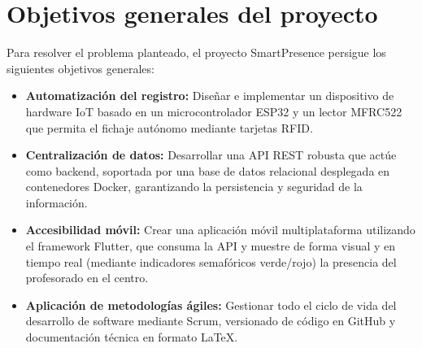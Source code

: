 \documentclass[12pt, a4paper]{report}
\begin{document}
\section{Objetivos generales del proyecto}
Para resolver el problema planteado, el proyecto SmartPresence persigue los siguientes objetivos generales:
\begin{itemize}
    \item \textbf{Automatización del registro:} Diseñar e implementar un dispositivo de hardware IoT basado en un microcontrolador ESP32 y un lector MFRC522 que permita el fichaje autónomo mediante tarjetas RFID.
    \item \textbf{Centralización de datos:} Desarrollar una API REST robusta que actúe como backend, soportada por una base de datos relacional desplegada en contenedores Docker, garantizando la persistencia y seguridad de la información.
    \item \textbf{Accesibilidad móvil:} Crear una aplicación móvil multiplataforma utilizando el framework Flutter, que consuma la API y muestre de forma visual y en tiempo real (mediante indicadores semafóricos verde/rojo) la presencia del profesorado en el centro.
    \item \textbf{Aplicación de metodologías ágiles:} Gestionar todo el ciclo de vida del desarrollo de software mediante Scrum, versionado de código en GitHub y documentación técnica en formato LaTeX.
\end{itemize}
\end{document}
